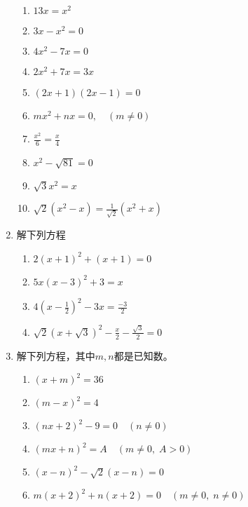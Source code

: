 \begin{enumerate}
\begin{multicols}{2}
\begin{enumerate}
    \item $13 x=x^{2}$
    \item $3 x-x^{2}=0$
    \item $4 x^{2}-7 x=0$
    \item $2 x^{2}+7 x=3 x$
    \item $(2 x+1)(2 x-1)=0$
    \item $ m x^{2}+n x=0,\quad (m \neq 0)$
    \item $\frac{x^{2}}{6}=\frac{x}{4}$
    \item  $x^{2}-\sqrt{81}=0$
    \item  $\sqrt{3} x^{2}=x$
    \item $\sqrt{2}\left(x^{2}-x\right)=\frac{1}{\sqrt{2}}\left(x^{2}+x\right)$
        \end{enumerate}
    \end{multicols}
    \item 解下列方程
    \begin{multicols}{2}
        \begin{enumerate}
    \item $2(x+1)^{2}+(x+1)=0$ 
    \item  $5 x(x-3)^{2}+3=x$
    \item  $4\left(x-\frac{1}{2}\right)^{2}-3 x=\frac{-3}{2}$
    \item  $\sqrt{2}(x+\sqrt{3})^{2}-\frac{x}{2}-\frac{\sqrt{3}}{2}=0$
        \end{enumerate}
    \end{multicols}
    \item 解下列方程，其中$m,n$都是已知数。
        \begin{enumerate}
\item $(x+m)^2=36$
\item $(m-x)^2=4$
\item $(nx+2)^2-9=0\quad  (n\ne 0)$
\item $(mx+n)^2=A\quad  (m\ne 0,\; A>0)$
\item $(x-n)^2-\sqrt{2}(x-n)=0$
\item  $m(x+2)^2+n(x+2)=0\quad  (m\ne 0,\; n\ne 0)$
        \end{enumerate}


\end{enumerate}
